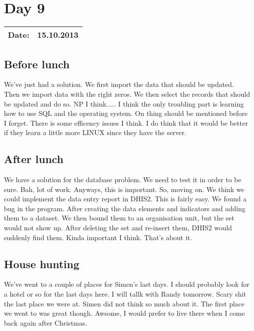 \section{Day 9}
\begin{tabular}{|c|c|}
\hline
Date: & 15.10.2013 \\
\hline
\end{tabular}
\subsection{Before lunch}
We've just had a solution. We first import the data that should be updated. Then we import data with the right zeros. We then select the records that should be updated and do so. NP I think..... I think the only troubling part is learning how to use SQL and the operating system. On thing should be mentioned before I forget. There is some efficency issues I think. I do think that it would be better if they learn a little more LINUX since they have the server.
\subsection{After lunch}
We have a solution for the database problem. We need to test it in order to be sure. Bah, lot of work. Anyways, this is important. So, moving on. We think we could implement the data entry report in DHIS2. This is fairly easy. We found a bug in the program. After creating the data elements and indicators and adding them to a dataset. We then bound them to an organisation unit, but the set would not show up. After deleting the set and re-insert them, DHIS2 would suddenly find them. Kinda important I think. That's about it.
\subsection{House hunting}
We've went to a couple of places for Simen's last days. I should probably look for a hotel or so for the last days here. I will tallk with Randy tomorrow. Scary shit the last place we were at. Simen did not think so much about it. The first place we went to was great though. Awsome, I would prefer to live there when I come back again after Christmas.

